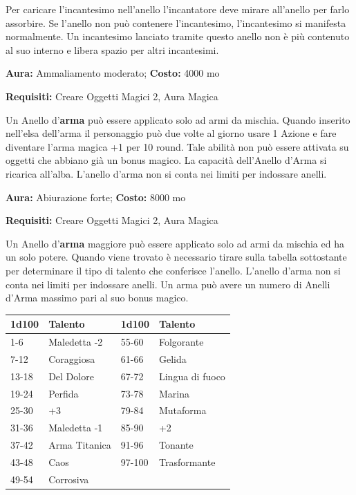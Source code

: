\begin{multicols}{2}
Per caricare l'incantesimo nell'anello l'incantatore deve mirare all'anello per farlo assorbire. Se l'anello non può contenere l'incantesimo, l'incantesimo si manifesta normalmente. Un incantesimo lanciato tramite questo anello non è più contenuto al suo interno e libera spazio per altri incantesimi.


\textbf{Aura:} Ammaliamento moderato; \textbf{Costo:} 4000 mo

\textbf{Requisiti:} Creare Oggetti Magici 2, Aura Magica

Un Anello d'\textbf{arma} può essere applicato solo ad armi da mischia. Quando inserito nell'elsa dell'arma il personaggio può due volte al giorno usare 1 Azione e fare diventare l'arma magica +1 per 10 round. Tale abilità non può essere attivata su oggetti che abbiano già un bonus magico.
La capacità dell'Anello d'Arma si ricarica all'alba. L'anello d'arma non si conta nei limiti per indossare anelli.


\textbf{Aura:} Abiurazione forte; \textbf{Costo:} 8000 mo

\textbf{Requisiti:} Creare Oggetti Magici 2, Aura Magica

Un Anello d'\textbf{arma} maggiore può essere applicato solo ad armi da mischia ed ha un solo potere. Quando viene trovato è necessario tirare sulla tabella sottostante per determinare il tipo di talento che conferisce l'anello. L'anello d'arma non si conta nei limiti per indossare anelli. Un arma può avere un numero di Anelli d'Arma massimo pari al suo bonus magico.

\medskip

\noindent\begin{tabularx}{\linewidth}{lX|lX}
	\toprule
\rowcolor{gray!20}\textbf{1d100} & \textbf{Talento} & \textbf{1d100} & \textbf{Talento} \\
\toprule
1-6 & Maledetta -2 & 55-60 & Folgorante \\
\rowcolor{gray!20}7-12 & Coraggiosa & 61-66 & Gelida \\
13-18 & Del Dolore & 67-72 & Lingua di fuoco \\
\rowcolor{gray!20}19-24 & Perfida & 73-78 & Marina \\
25-30 & +3 & 79-84 & Mutaforma \\
\rowcolor{gray!20}31-36 & Maledetta -1 & 85-90 & +2 \\
37-42 & Arma Titanica & 91-96 & Tonante \\
\rowcolor{gray!20}43-48 & Caos & 97-100 & Trasformante \\
49-54 & Corrosiva & & \\


\end{tabularx}
\end{multicols}
